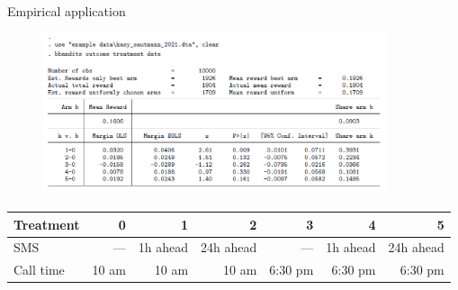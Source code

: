 \documentclass[11pt,table]{beamer}
\begin{document}
\begin{frame}{Empirical application \citep{Kasy2021}}

\begin{figure}[h]
\begin{center}
{\includegraphics[width=0.9\textwidth]{figures/stlogKasy2021.png}}
\end{center}
\vspace*{-2.5ex}
\end{figure}

\begin{table}
\tiny
    \centering
    \begin{tabular}{lrrrrrr}
    \toprule
Treatment & 0 & 1 & 2 & 3 & 4 & 5\\
         \midrule
         SMS& --- & 1h ahead & 24h ahead & --- & 1h ahead & 24h ahead \\
         Call time& 10 am & 10 am & 10 am & 6:30 pm & 6:30 pm & 6:30 pm \\\bottomrule         
    \end{tabular}
    \label{tab:my_label}
\end{table}

\end{frame}
\end{document}
